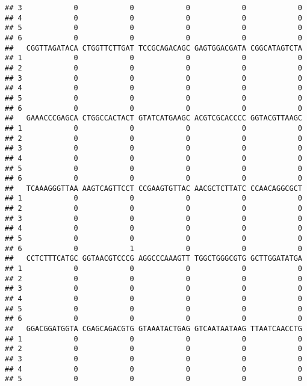 \documentclass[]{article}
\begin{document}
\begin{verbatim}
## 3            0            0            0            0            0
## 4            0            0            0            0            0
## 5            0            0            0            0            0
## 6            0            0            0            0            0
##   CGGTTAGATACA CTGGTTCTTGAT TCCGCAGACAGC GAGTGGACGATA CGGCATAGTCTA
## 1            0            0            0            0            0
## 2            0            0            0            0            0
## 3            0            0            0            0            0
## 4            0            0            0            0            0
## 5            0            0            0            0            0
## 6            0            0            0            0            0
##   GAAACCCGAGCA CTGGCCACTACT GTATCATGAAGC ACGTCGCACCCC GGTACGTTAAGC
## 1            0            0            0            0            0
## 2            0            0            0            0            0
## 3            0            0            0            0            0
## 4            0            0            0            0            0
## 5            0            0            0            0            0
## 6            0            0            0            0            0
##   TCAAAGGGTTAA AAGTCAGTTCCT CCGAAGTGTTAC AACGCTCTTATC CCAACAGGCGCT
## 1            0            0            0            0            0
## 2            0            0            0            0            0
## 3            0            0            0            0            0
## 4            0            0            0            0            0
## 5            0            0            0            0            0
## 6            0            1            0            0            0
##   CCTCTTTCATGC GGTAACGTCCCG AGGCCCAAAGTT TGGCTGGGCGTG GCTTGGATATGA
## 1            0            0            0            0            0
## 2            0            0            0            0            0
## 3            0            0            0            0            0
## 4            0            0            0            0            0
## 5            0            0            0            0            0
## 6            0            0            0            0            0
##   GGACGGATGGTA CGAGCAGACGTG GTAAATACTGAG GTCAATAATAAG TTAATCAACCTG
## 1            0            0            0            0            0
## 2            0            0            0            0            0
## 3            0            0            0            0            0
## 4            0            0            0            0            0
## 5            0            0            0            0            0

\end{verbatim}
\end{document}
